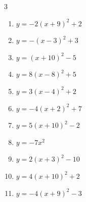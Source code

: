 \begin{multicols}{3}
\begin{enumerate}
        \phantom{$\displaystyle 頂点\left( 4 , -10 \right)$}

  \item $\displaystyle y=-2\left( x+9\right)^{2}+2$

        \phantom{$\displaystyle 頂点\left( -9 , 2 \right)$}

  \item $\displaystyle y=-\left( x-3\right)^{2}+3$

        \phantom{$\displaystyle 頂点\left( 3 , 3 \right)$}

  \item $\displaystyle y=\left( x+10\right)^{2}-5$

        \phantom{$\displaystyle 頂点\left( -10 , -5 \right)$}

  \item $\displaystyle y=8\left( x-8\right)^{2}+5$

        \phantom{$\displaystyle 頂点\left( 8 , 5 \right)$}

  \item $\displaystyle y=3\left( x-4\right)^{2}+2$

        \phantom{$\displaystyle 頂点\left( 4 , 2 \right)$}

  \item $\displaystyle y=-4\left( x+2\right)^{2}+7$

        \phantom{$\displaystyle 頂点\left( -2 , 7 \right)$}

  \item $\displaystyle y=5\left( x+10\right)^{2}-2$

        \phantom{$\displaystyle 頂点\left( -10 , -2 \right)$}

  \item $\displaystyle y=-7x^{2}$

        \phantom{$\displaystyle 頂点\left( 0 , 0 \right)$}

  \item $\displaystyle y=2\left( x+3\right)^{2}-10$

        \phantom{$\displaystyle 頂点\left( -3 , -10 \right)$}

\columnbreak %

  \item $\displaystyle y=4\left( x+10\right)^{2}+2$

        \phantom{$\displaystyle 頂点\left( -10 , 2 \right)$}

  \item $\displaystyle y=-4\left( x+9\right)^{2}-3$


\end{enumerate}
\end{multicols}
